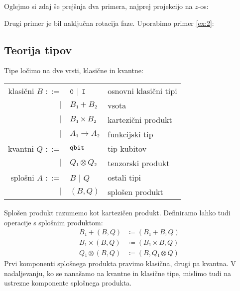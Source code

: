 \begin{example*}\label{ex:5}
    Oglejmo si zdaj še prejšnja dva primera, najprej projekcijo na \(z\)-os:
    \begin{center}
    \end{center}
\end{example*}

\begin{example*}\label{ex:6}
    Drugi primer je bil naključna rotacija faze. Uporabimo primer \ref{ex:2}:
    \begin{center}
    \end{center}
\end{example*}


\subsection{Teorija tipov}

Tipe ločimo na dve vrsti, klasične in kvantne:\\
\begin{tabular}{r l l}%
    klasični \(B\) \(::=\)& \(\text{\ttfamily0}\) \(\mid\) \(\text{\ttfamily I}\)                & osnovni klasični tipi\\
                  \(\mid\)& \(B₁+B₂\)                                      & vsota\\
                  \(\mid\)& \(B₁×B₂\)                                      & kartezični produkt\\
                  \(\mid\)& \(A₁ → A₂\)                                    & funkcijski tip\\
    kvantni \(Q\) \(::=\)&  \(\text{\ttfamily qbit}\)                                      & tip kubitov\\
                 \(\mid\)&  \(Q₁⊗Q₂\)                                     & tenzorski produkt\\
    splošni \(A\) \(::=\)&  \(B\) \(\mid\) \(Q\)                           & ostali tipi\\
                 \(\mid\)&  \((B,Q)\)                                      & splošen produkt\\
\end{tabular}
\begin{remark}
    Splošen produkt razumemo kot kartezičen produkt.
    Definiramo lahko tudi operacije s splošnim produktom:
    \begin{align*}
        B₁+(B,Q) &≔ (B₁+B,Q)\\
        B₁×(B,Q) &≔ (B₁×B,Q)\\
        Q₁⊗(B,Q) &≔ (B,Q₁⊗Q)
    \end{align*}
    Prvi komponenti splošnega produkta pravimo klasična, drugi pa kvantna.
    V nadaljevanju, ko se nanašamo na kvantne in klasične tipe, mislimo tudi na ustrezne komponente splošnega produkta.
\end{remark}

